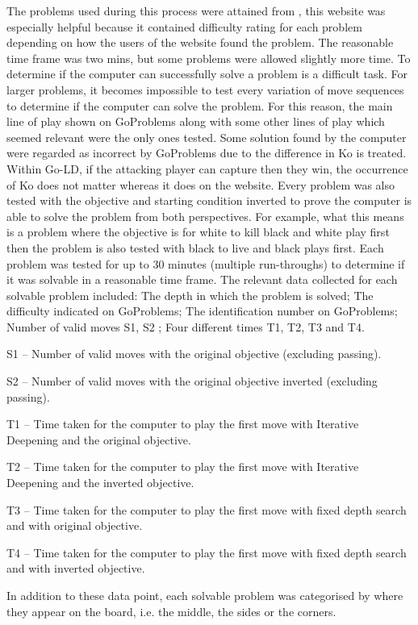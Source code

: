 \documentclass{l4proj}
\begin{document}
The problems used during this process were attained from \cite{GoProblems}, this website was especially helpful because it contained difficulty rating for each problem depending on how the users of the website found the problem. The reasonable time frame was two mins, but some problems were allowed slightly more time.
To determine if the computer can successfully solve a problem is a difficult task. For larger problems, it becomes impossible to test every variation of move sequences to determine if the computer can solve the problem. For this reason,  the main line of play shown on GoProblems along with some other lines of play which seemed relevant were the only ones tested. Some solution found by the computer were regarded as incorrect by GoProblems due to the difference in Ko is treated. Within Go-LD, if the attacking player can capture then they win, the occurrence of Ko does not matter whereas it does on the website. Every problem was also tested with the objective and starting condition inverted to prove the computer is able to solve the problem from both perspectives. For example, what this means is a problem where the objective is for white to kill black and white play first then the problem is also tested with black to live and black plays first. Each problem was tested for up to 30 minutes (multiple run-throughs) to determine if it was solvable in a reasonable time frame.
The relevant data collected for each solvable problem included: The depth in which the problem is solved; The difficulty indicated on GoProblems; The identification number on GoProblems; Number of valid moves S1, S2 ; Four different times T1, T2, T3 and T4.

S1 – Number of valid moves with the original objective (excluding passing).

S2 – Number of valid moves with the original objective inverted (excluding passing).


T1 – Time taken for the computer to play the first move with Iterative Deepening and the original objective.

T2 – Time taken for the computer to play the first move with Iterative Deepening and the inverted objective.

T3 – Time taken for the computer to play the first move with fixed depth search and with original objective.

T4 – Time taken for the computer to play the first move with fixed depth search and with inverted objective.

In addition to these data point, each solvable problem was categorised by where they appear on the board, i.e. the middle, the sides or the corners.
\end{document}
